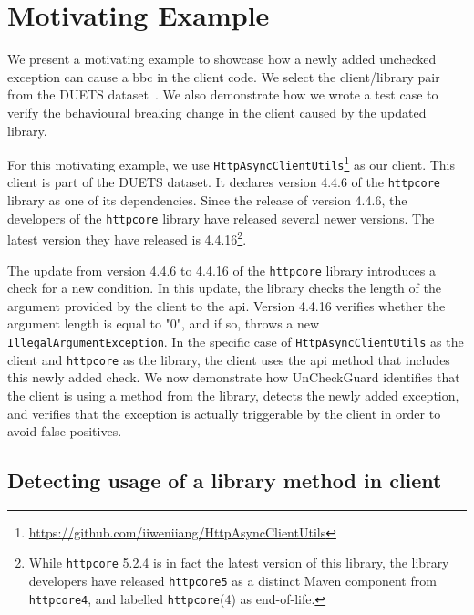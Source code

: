 \chapter{Motivating Example}

We present a motivating example to showcase how a newly added unchecked exception can cause a \gls{bbc} in the client code. We select the client/library pair from the DUETS dataset~\cite{durieux21:_duets}. We also demonstrate how we wrote a test case to verify the behavioural breaking change in the client caused by the updated library.

For this motivating example, we use \texttt{HttpAsyncClientUtils}\footnote{\url{https://github.com/iiweniiang/HttpAsyncClientUtils}} as our client. This client is part of the DUETS dataset. It declares version 4.4.6 of the \texttt{httpcore} library as one of its dependencies. Since the release of version 4.4.6, the developers of the \texttt{httpcore} library have released several newer versions. The latest version they have released is 4.4.16\footnote{While \texttt{httpcore} 5.2.4 is in fact the latest version of this library, the library developers have released \texttt{httpcore5} as a distinct Maven component from \texttt{httpcore4}, and labelled \texttt{httpcore}(4) as end-of-life.}.

The update from version 4.4.6 to 4.4.16 of the \texttt{httpcore} library introduces a check for a new condition. In this update, the library checks the length of the argument provided by the client to the \gls{api}. Version 4.4.16 verifies whether the argument length is equal to "0", and if so, throws a new \texttt{IllegalArgumentException}. In the specific case of \texttt{HttpAsyncClientUtils} as the client and \texttt{httpcore} as the library, the client uses the \gls{api} method that includes this newly added check. We now demonstrate how UnCheckGuard identifies that the client is using a method from the library, detects the newly added exception, and verifies that the exception is actually triggerable by the client in order to avoid false positives.

\section{Detecting usage of a library method in client}

